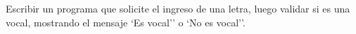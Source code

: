 ﻿
Escribir un programa que solicite el ingreso de una letra, luego validar si es una vocal, mostrando el mensaje `Es vocal'' o `No es vocal''.



\volverindice
\newpage
